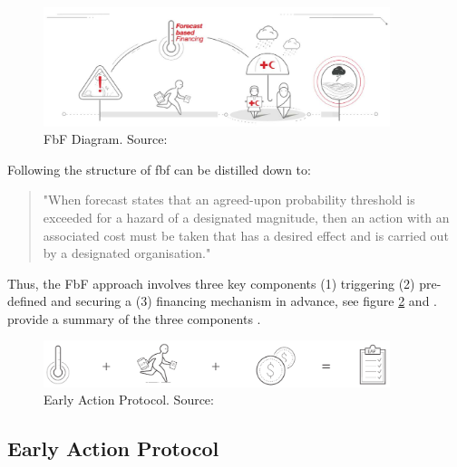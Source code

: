 \begin{figure}[!htp]
    \centering
    \includegraphics[width=0.9\textwidth]{figures/2023_MA_th_fbf_diagram.jpg}
    \decoRule
    \caption[FbF Diagram]{FbF Diagram. Source: \textcite{rcrcForecastbasedFinancingEarly2020}}
    \label{fig:th_fbf_diagram}
\end{figure}

Following \autocite{coughlandeperezForecastbasedFinancingApproach2015, coughlandeperezActionbasedFloodForecasting2016} the structure of \acrshort{fbf} can be distilled down to:
\begin{quote}
    "When forecast states that an agreed-upon probability threshold is exceeded for a hazard of a designated magnitude, then an action with an associated cost must be taken that has a desired effect and is carried out by a designated organisation." \autocite[2]{coughlandeperezActionbasedFloodForecasting2016}
\end{quote}

Thus, the FbF approach involves three key components (1) triggering (2) pre-defined  and securing a (3) financing mechanism in advance, see figure \ref{fig:th_eap_stages} and \textcite{ifrcForecastbasedFinancingNew2019}.  provide a summary of the three components \autocite{ruthForecastbasedFinancingPolicy2017}.

\begin{figure}[!htp]
    \centering
    \includegraphics[width=0.9\textwidth]{figures/2023_MA_th_eap.pdf}
    \decoRule
    \caption[Early Action Protocol]{Early Action Protocol. Source: \textcite{ifrcForecastbasedFinancingNew2019}}
    \label{fig:th_eap_stages}
\end{figure}

\subsection{Early Action Protocol}\label{subsec:eap}

